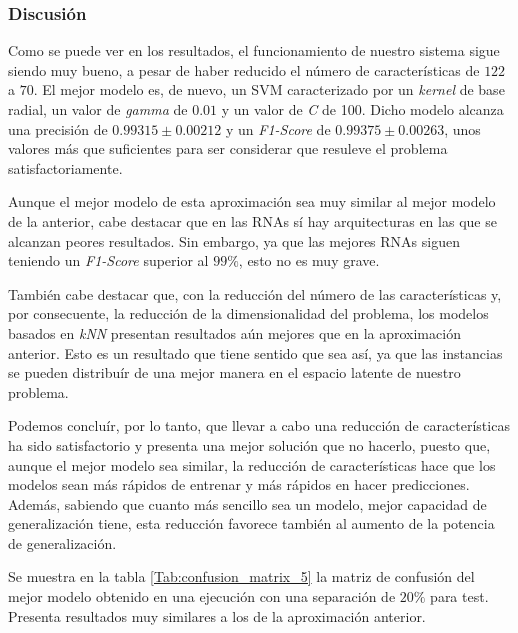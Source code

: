 \documentclass[12pt]{article}
\begin{document}
\subsubsection{Discusión}

Como se puede ver en los resultados, el funcionamiento de nuestro sistema sigue siendo
muy bueno, a pesar de haber reducido el número de  características de $122$ a $70$. 
El mejor modelo es, de nuevo, un SVM caracterizado por un \textit{kernel} de base radial,
un valor de \textit{gamma} de $0.01$ y un valor de \textit{C} de 100. Dicho modelo alcanza una precisión
de $0.99315 \pm 0.00212$ y un \textit{F1-Score} de $0.99375 \pm 0.00263$,
unos valores más que suficientes para ser considerar que resuleve el problema satisfactoriamente. 

\bigskip
Aunque el mejor modelo de esta aproximación sea muy similar al mejor
modelo de la anterior, cabe destacar que en las RNAs sí hay
arquitecturas en las que se alcanzan peores resultados. Sin embargo, ya que las mejores RNAs siguen 
teniendo un \textit{F1-Score} superior al $99\%$, esto no es muy grave.

\bigskip
También cabe destacar que, con la reducción del número de las características y,
por consecuente, la reducción de la dimensionalidad del problema, los modelos basados
en \textit{kNN} presentan resultados aún mejores que en la aproximación anterior.
Esto es un resultado que tiene sentido que sea así, ya que las instancias se pueden
distribuír de una mejor manera en el espacio latente de nuestro problema.

\bigskip
Podemos concluír, por lo tanto, que llevar a cabo una reducción de características ha sido
satisfactorio y presenta una mejor solución que no hacerlo, puesto que, aunque el mejor
modelo sea similar, la reducción de características hace que los modelos sean más rápidos
de entrenar y más rápidos en hacer predicciones. Además, sabiendo que cuanto más sencillo sea un modelo, mejor capacidad
de generalización tiene, esta reducción favorece también al aumento de la potencia de
generalización.

\bigskip
Se muestra en la tabla \ref{Tab:confusion_matrix_5} la matriz de confusión del mejor
modelo obtenido en una ejecución con una separación de $20\%$ para test. Presenta
resultados muy similares a los de la aproximación anterior.
\end{document}
